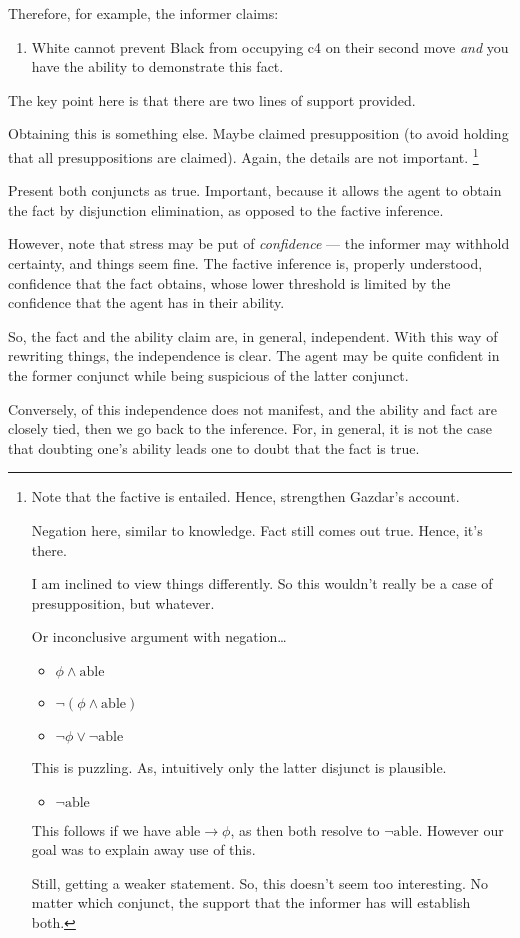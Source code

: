 \documentclass[10pt]{article}
\begin{document}
Therefore, for example, the informer claims:
\begin{enumerate}
\item\label{chess:claim:1:conj} White cannot prevent Black from occupying c4 on their second move \emph{and} you have the ability to demonstrate this fact.
\end{enumerate}

{
  \color{red}
  The key point here is that there are two lines of support provided.
}

Obtaining this is something else.
Maybe claimed presupposition (to avoid holding that all presuppositions are claimed).
Again, the details are not important.\nolinebreak
\footnote{
  Note that the factive is entailed.
  Hence, strengthen Gazdar's account.

  Negation here, similar to knowledge.
  Fact still comes out true.
  Hence, it's there.

  I am inclined to view things differently.
  So this wouldn't really be a case of presupposition, but whatever.

  Or inconclusive argument with negation\dots

  \begin{itemize}
  \item \(\phi \land \text{able}\)
  \item \(\lnot(\phi \land \text{able})\)
  \item \(\lnot\phi \lor \lnot\text{able}\)
  \end{itemize}
  This is puzzling.
  As, intuitively only the latter disjunct is plausible.
  \begin{itemize}
  \item \(\lnot\text{able}\)
  \end{itemize}
  This follows if we have \(\text{able} \rightarrow \phi\), as then both resolve to \(\lnot\text{able}\).
  However our goal was to explain away use of this.

  Still, getting a weaker statement.
  So, this doesn't seem too interesting.
  No matter which conjunct, the support that the informer has will establish both.
}

Present both conjuncts as true.
Important, because it allows the agent to obtain the fact by disjunction elimination, as opposed to the factive inference.

{
  \color{red}
  However, note that stress may be put of \emph{confidence} --- the informer may withhold certainty, and things seem fine.
  The factive inference is, properly understood, confidence that the fact obtains, whose lower threshold is limited by the confidence that the agent has in their ability.

  So, the fact and the ability claim are, in general, independent.
  With this way of rewriting things, the independence is clear.
  The agent may be quite confident in the former conjunct while being suspicious of the latter conjunct.

  Conversely, of this independence does not manifest, and the ability and fact are closely tied, then we go back to the inference.
  For, in general, it is not the case that doubting one's ability leads one to doubt that the fact is true.
}
\end{document}
